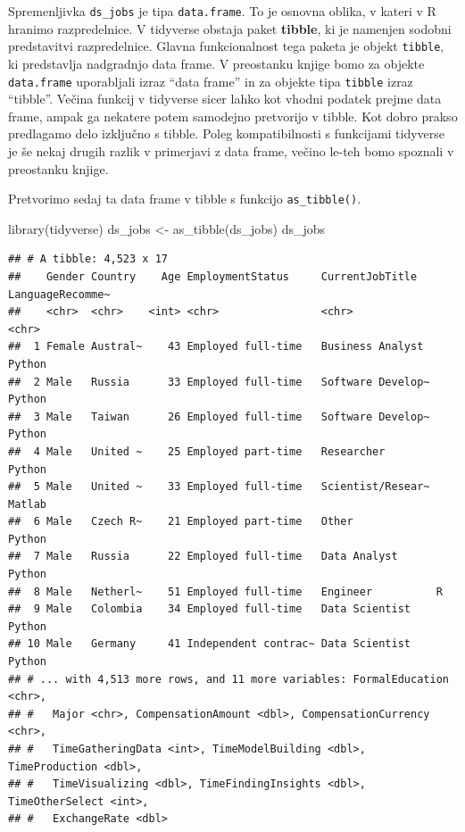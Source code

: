 \documentclass[
]{book}
\newenvironment{Shaded}{\begin{snugshade}}{\end{snugshade}}
\newcommand{\FunctionTok}[1]{\textcolor[rgb]{0.00,0.00,0.00}{#1}}
\newcommand{\NormalTok}[1]{#1}
\newcommand{\OtherTok}[1]{\textcolor[rgb]{0.56,0.35,0.01}{#1}}
\begin{document}
Spremenljivka \texttt{ds\_jobs} je tipa \texttt{data.frame}. To je osnovna oblika, v kateri v R hranimo razpredelnice. V tidyverse obstaja paket \textbf{tibble}, ki je namenjen sodobni predstavitvi razpredelnice. Glavna funkcionalnost tega paketa je objekt \texttt{tibble}, ki predstavlja nadgradnjo data frame. V preostanku knjige bomo za objekte \texttt{data.frame} uporabljali izraz ``data frame'' in za objekte tipa \texttt{tibble} izraz ``tibble''. Večina funkcij v tidyverse sicer lahko kot vhodni podatek prejme data frame, ampak ga nekatere potem samodejno pretvorijo v tibble. Kot dobro prakso predlagamo delo izključno s tibble. Poleg kompatibilnosti s funkcijami tidyverse je še nekaj drugih razlik v primerjavi z data frame, večino le-teh bomo spoznali v preostanku knjige.

Pretvorimo sedaj ta data frame v tibble s funkcijo \texttt{as\_tibble()}.

\begin{Shaded}
\begin{Highlighting}[]
\FunctionTok{library}\NormalTok{(tidyverse)}
\NormalTok{ds\_jobs }\OtherTok{\textless{}{-}} \FunctionTok{as\_tibble}\NormalTok{(ds\_jobs)}
\NormalTok{ds\_jobs}
\end{Highlighting}
\end{Shaded}

\begin{verbatim}
## # A tibble: 4,523 x 17
##    Gender Country    Age EmploymentStatus     CurrentJobTitle   LanguageRecomme~
##    <chr>  <chr>    <int> <chr>                <chr>             <chr>           
##  1 Female Austral~    43 Employed full-time   Business Analyst  Python          
##  2 Male   Russia      33 Employed full-time   Software Develop~ Python          
##  3 Male   Taiwan      26 Employed full-time   Software Develop~ Python          
##  4 Male   United ~    25 Employed part-time   Researcher        Python          
##  5 Male   United ~    33 Employed full-time   Scientist/Resear~ Matlab          
##  6 Male   Czech R~    21 Employed part-time   Other             Python          
##  7 Male   Russia      22 Employed full-time   Data Analyst      Python          
##  8 Male   Netherl~    51 Employed full-time   Engineer          R               
##  9 Male   Colombia    34 Employed full-time   Data Scientist    Python          
## 10 Male   Germany     41 Independent contrac~ Data Scientist    Python          
## # ... with 4,513 more rows, and 11 more variables: FormalEducation <chr>,
## #   Major <chr>, CompensationAmount <dbl>, CompensationCurrency <chr>,
## #   TimeGatheringData <int>, TimeModelBuilding <dbl>, TimeProduction <dbl>,
## #   TimeVisualizing <dbl>, TimeFindingInsights <dbl>, TimeOtherSelect <int>,
## #   ExchangeRate <dbl>
\end{verbatim}
\end{document}
